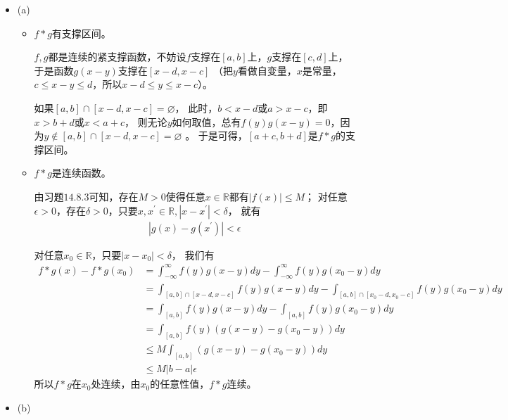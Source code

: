 \documentclass{article}
\begin{document}
\begin{itemize}
  \item (a)

        \begin{itemize}
          \item $f \ast g$有支撑区间。

                $f,g$都是连续的紧支撑函数，不妨设$f$支撑在$[a,b]$上，$g$支撑在$[c,d]$上，于是函数$g(x - y)$支撑在$[x - d, x - c]$
                （把$y$看做自变量，$x$是常量，$c \leq x - y \leq d$，所以$x - d \leq y \leq x - c$）。

                如果$[a,b] \cap [x - d, x - c] = \varnothing$，
                此时，$b < x - d$或$a > x - c$，即$x > b + d$或$x < a + c$，
                则无论$y$如何取值，总有$f(y)g(x-y) = 0$，因为$y \notin [a,b] \cap [x - d, x - c] = \varnothing$ 。
                于是可得，$[a + c, b + d]$是$f \ast g$的支撑区间。

          \item $f \ast g$是连续函数。

                由习题$14.8.3$可知，存在$M > 0$使得任意$x \in \mathbb{R}$都有$|f(x)| \leq M$；
                对任意$\epsilon > 0$，存在$\delta > 0$，只要$x, x^\prime \in \mathbb{R}, |x - x^\prime| < \delta$，
                就有
                \begin{align*}
                  |g(x) - g(x^\prime)| < \epsilon
                \end{align*}

                对任意$x_0 \in \mathbb{R}$，只要$|x - x_0| < \delta$，
                我们有
                \begin{align*}
                  f \ast g(x) - f \ast g(x_0)
                   & = \int_{-\infty}^{\infty} f(y)g(x - y) dy - \int_{-\infty}^{\infty} f(y)g(x_0 - y) dy                         \\
                   & = \int_{[a, b] \cap [x - d, x - c]} f(y)g(x - y) dy - \int_{[a, b] \cap [x_0 - d, x_0 - c]} f(y)g(x_0 - y) dy \\
                   & = \int_{[a, b]} f(y)g(x - y) dy - \int_{[a, b]} f(y)g(x_0 - y) dy                                             \\
                   & = \int_{[a, b]} f(y)(g(x - y) - g(x_0 - y)) dy                                                                \\
                   & \leq M \int_{[a, b]} (g(x - y) - g(x_0 - y)) dy                                                               \\
                   & \leq M |b-a|\epsilon
                \end{align*}
                所以$f \ast g$在$x_0$处连续，由$x_0$的任意性值，$f \ast g$连续。
        \end{itemize}
  \item (b)


\end{itemize}
\end{document}
